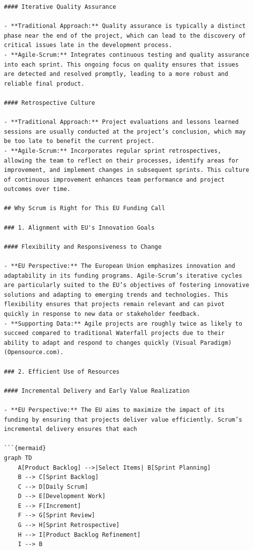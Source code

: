 \documentclass[
  letterpaper,
  DIV=11,
  numbers=noendperiod]{scrreprt}
\begin{document}
\begin{verbatim}
#### Iterative Quality Assurance

- **Traditional Approach:** Quality assurance is typically a distinct phase near the end of the project, which can lead to the discovery of critical issues late in the development process.
- **Agile-Scrum:** Integrates continuous testing and quality assurance into each sprint. This ongoing focus on quality ensures that issues are detected and resolved promptly, leading to a more robust and reliable final product.

#### Retrospective Culture

- **Traditional Approach:** Project evaluations and lessons learned sessions are usually conducted at the project’s conclusion, which may be too late to benefit the current project.
- **Agile-Scrum:** Incorporates regular sprint retrospectives, allowing the team to reflect on their processes, identify areas for improvement, and implement changes in subsequent sprints. This culture of continuous improvement enhances team performance and project outcomes over time.

## Why Scrum is Right for This EU Funding Call

### 1. Alignment with EU's Innovation Goals

#### Flexibility and Responsiveness to Change

- **EU Perspective:** The European Union emphasizes innovation and adaptability in its funding programs. Agile-Scrum’s iterative cycles are particularly suited to the EU’s objectives of fostering innovative solutions and adapting to emerging trends and technologies. This flexibility ensures that projects remain relevant and can pivot quickly in response to new data or stakeholder feedback.
- **Supporting Data:** Agile projects are roughly twice as likely to succeed compared to traditional Waterfall projects due to their ability to adapt and respond to changes quickly (Visual Paradigm) (Opensource.com).

### 2. Efficient Use of Resources

#### Incremental Delivery and Early Value Realization

- **EU Perspective:** The EU aims to maximize the impact of its funding by ensuring that projects deliver value efficiently. Scrum’s incremental delivery ensures that each

```{mermaid}
graph TD
    A[Product Backlog] -->|Select Items| B[Sprint Planning]
    B --> C[Sprint Backlog]
    C --> D[Daily Scrum]
    D --> E[Development Work]
    E --> F[Increment]
    F --> G[Sprint Review]
    G --> H[Sprint Retrospective]
    H --> I[Product Backlog Refinement]
    I --> B


\end{verbatim}
\end{document}
